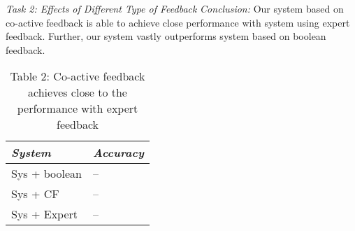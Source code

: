 \noindent\textit{Task 2: Effects of Different Type of Feedback}
\textit{Conclusion:} Our system based on co-active feedback is able to achieve close performance with system using expert feedback. Further, our system vastly outperforms system based on boolean feedback.

\begin{table}
\label{tbl:tsk2}
\caption{Table 2: Co-active feedback achieves close to the performance with expert feedback}
\centering
\begin{tabular}{|l|l|}
\hline
\textit{System} & \textit{Accuracy} \\
\hline
Sys + boolean & --\\
Sys + CF & -- \\
Sys + Expert & -- \\
\hline
\end{tabular}
\end{table}


